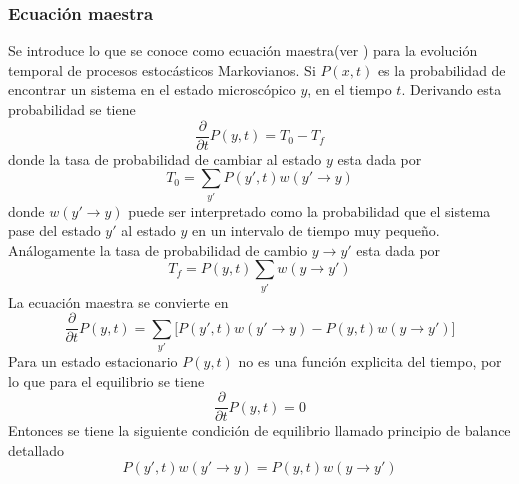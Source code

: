 \documentclass[a4paper]{article}
\begin{document}
\subsubsection{Ecuación maestra}
Se introduce lo que se conoce como ecuación maestra(ver \cite{silvio}) para la evolución temporal de procesos estocásticos Markovianos. Si $P(x,t)$ es la probabilidad de encontrar un sistema en el estado microscópico $y$, en el tiempo $t$. Derivando esta probabilidad se tiene
\begin{equation}
\frac{\partial}{\partial t}P(y,t)=T_0-T_f
\end{equation}
donde la tasa de probabilidad de cambiar al estado $y$ esta dada por
\begin{equation}
T_0=\sum_{y'}P(y',t)w(y'\rightarrow y)
\end{equation}
donde $w(y'\rightarrow y)$ puede ser interpretado como la probabilidad que el sistema pase del estado $y'$ al estado $y$ en un intervalo de tiempo muy pequeño. Análogamente la tasa de probabilidad de cambio $y\rightarrow y'$ esta dada por
\begin{equation}
T_f=P(y,t)\sum_{y'}w(y\rightarrow y')
\end{equation}
La ecuación maestra se convierte en 
\begin{equation}\label{masterEq}
\frac{\partial}{\partial t}P(y,t)=\sum_{y'}\Big[P(y',t)w(y'\rightarrow y)-P(y,t)w(y\rightarrow y')\Big]
\end{equation}
Para un estado estacionario $P(y,t)$ no es una función explicita del tiempo, por lo que para el equilibrio se tiene
\begin{equation}
\frac{\partial}{\partial t}P(y,t)=0
\end{equation}
Entonces se tiene la siguiente condición de equilibrio llamado principio de balance detallado
\begin{equation}\label{equi}
P(y',t)w(y'\rightarrow y)=P(y,t)w(y\rightarrow y')
\end{equation}
\end{document}
